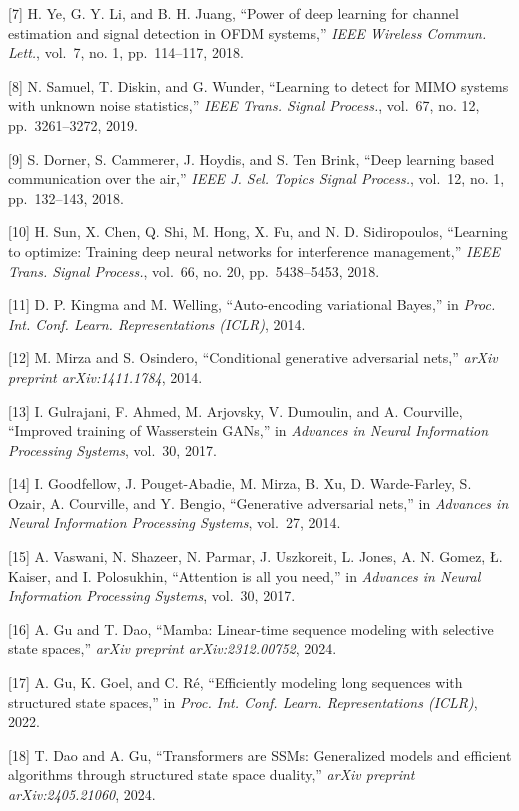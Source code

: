 \documentclass[
  english,
  12pt,
  12pt,
  a4paper,
  oneside]{report}
\begin{document}
{[}7{]} H. Ye, G. Y. Li, and B. H. Juang, ``Power of deep learning for channel estimation and signal detection in OFDM systems,'' \emph{IEEE Wireless Commun. Lett.}, vol.~7, no. 1, pp.~114--117, 2018.

{[}8{]} N. Samuel, T. Diskin, and G. Wunder, ``Learning to detect for MIMO systems with unknown noise statistics,'' \emph{IEEE Trans. Signal Process.}, vol.~67, no. 12, pp.~3261--3272, 2019.

{[}9{]} S. Dorner, S. Cammerer, J. Hoydis, and S. Ten Brink, ``Deep learning based communication over the air,'' \emph{IEEE J. Sel. Topics Signal Process.}, vol.~12, no. 1, pp.~132--143, 2018.

{[}10{]} H. Sun, X. Chen, Q. Shi, M. Hong, X. Fu, and N. D. Sidiropoulos, ``Learning to optimize: Training deep neural networks for interference management,'' \emph{IEEE Trans. Signal Process.}, vol.~66, no. 20, pp.~5438--5453, 2018.

{[}11{]} D. P. Kingma and M. Welling, ``Auto-encoding variational Bayes,'' in \emph{Proc. Int. Conf. Learn. Representations (ICLR)}, 2014.

{[}12{]} M. Mirza and S. Osindero, ``Conditional generative adversarial nets,'' \emph{arXiv preprint arXiv:1411.1784}, 2014.

{[}13{]} I. Gulrajani, F. Ahmed, M. Arjovsky, V. Dumoulin, and A. Courville, ``Improved training of Wasserstein GANs,'' in \emph{Advances in Neural Information Processing Systems}, vol.~30, 2017.

{[}14{]} I. Goodfellow, J. Pouget-Abadie, M. Mirza, B. Xu, D. Warde-Farley, S. Ozair, A. Courville, and Y. Bengio, ``Generative adversarial nets,'' in \emph{Advances in Neural Information Processing Systems}, vol.~27, 2014.

{[}15{]} A. Vaswani, N. Shazeer, N. Parmar, J. Uszkoreit, L. Jones, A. N. Gomez, Ł. Kaiser, and I. Polosukhin, ``Attention is all you need,'' in \emph{Advances in Neural Information Processing Systems}, vol.~30, 2017.

{[}16{]} A. Gu and T. Dao, ``Mamba: Linear-time sequence modeling with selective state spaces,'' \emph{arXiv preprint arXiv:2312.00752}, 2024.

{[}17{]} A. Gu, K. Goel, and C. Ré, ``Efficiently modeling long sequences with structured state spaces,'' in \emph{Proc. Int. Conf. Learn. Representations (ICLR)}, 2022.

{[}18{]} T. Dao and A. Gu, ``Transformers are SSMs: Generalized models and efficient algorithms through structured state space duality,'' \emph{arXiv preprint arXiv:2405.21060}, 2024.
\end{document}
